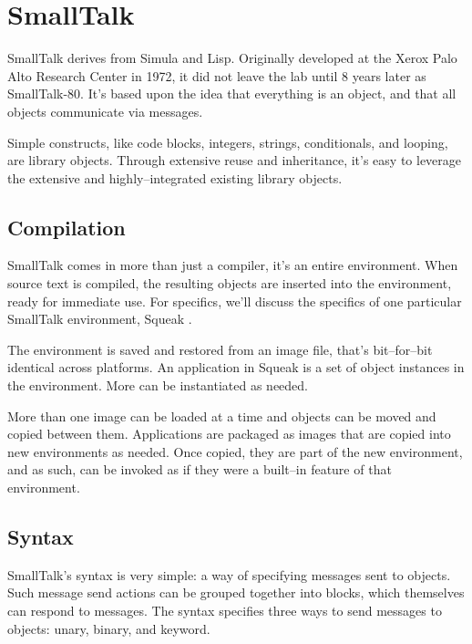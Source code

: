 \section{SmallTalk}
	SmallTalk derives from Simula and Lisp.  Originally developed at the Xerox Palo Alto Research Center in 1972, it did not leave the lab until 8 years later as SmallTalk-80. %
	It's based upon the idea that everything is an object, and that all objects communicate via messages.

	Simple constructs, like code blocks, integers, strings, conditionals, and looping, are library objects.  Through extensive reuse and inheritance, it's easy to leverage the extensive and highly--integrated existing library objects.  

\subsection{Compilation}
	SmallTalk comes in more than just a compiler, it's an entire environment.  When source text is compiled, the resulting objects are inserted into the environment, ready for immediate use.  For specifics, we'll discuss the specifics of one particular SmallTalk environment, Squeak \cite{squeak}.

	The environment is saved and restored from an image file, that's bit--for--bit identical across platforms.  An application in Squeak is a set of object instances in the environment.  More can be instantiated as needed.

	More than one image can be loaded at a time and objects can be moved and copied between them.%
Applications are packaged as images that are copied into new environments as needed.  Once copied, they are part of the new environment, and as such, can be invoked as if they were a built--in feature of that environment.

\subsection{Syntax}
	SmallTalk's syntax is very simple: a way of specifying messages sent to objects.  Such message send actions can be grouped together into blocks, which themselves can respond to messages.  The syntax specifies three ways to send messages to objects: unary, binary, and keyword.

